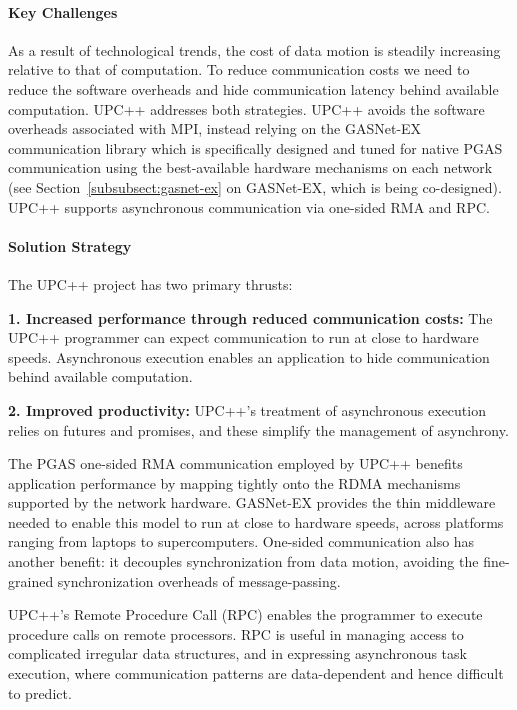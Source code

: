 \paragraph{Key  Challenges}

As a result of technological trends, the cost of data motion is steadily increasing relative to that of computation.  To reduce communication costs we need to 
reduce the software overheads and hide communication latency behind available computation. UPC++ addresses both strategies.
UPC++ avoids the software overheads associated with MPI, 
instead relying on the GASNet-EX~\cite{gasnet-site,gasnet-lcpc18}
communication library which is specifically designed and tuned
for native PGAS communication using the best-available hardware
mechanisms on each network
(see Section~\ref{subsubsect:gasnet-ex} on GASNet-EX, which is being co-designed).
UPC++ supports asynchronous communication via one-sided RMA and RPC.

\paragraph{Solution Strategy}

The UPC++ project has two primary thrusts:


\textbf{1. Increased performance through reduced communication costs:} The
UPC++ programmer can expect communication to run at close to hardware speeds.
Asynchronous execution enables an application to hide communication behind
available computation.

\textbf{2. Improved productivity:}  UPC++'s treatment of asynchronous
execution relies on futures and promises, and these simplify the management of
asynchrony.

The PGAS one-sided RMA communication employed by UPC++
benefits application  performance by mapping tightly onto the RDMA mechanisms
supported by the network hardware. GASNet-EX provides the
thin middleware
needed to enable this model to run at close to hardware speeds, across platforms ranging from laptops to supercomputers.
One-sided communication also has another benefit:
it decouples synchronization from data motion,
avoiding the fine-grained synchronization overheads of message-passing.

UPC++'s Remote Procedure Call (RPC)
enables the programmer
to execute procedure calls on remote processors.
RPC is useful in managing access to complicated irregular data structures,
and in expressing asynchronous task execution, where communication patterns
are data-dependent and hence difficult to predict.

